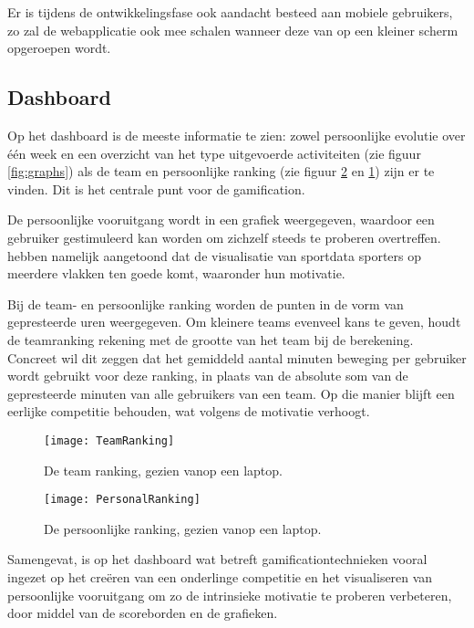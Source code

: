 Er is tijdens de ontwikkelingsfase ook aandacht besteed aan mobiele gebruikers, zo zal de webapplicatie ook mee schalen wanneer deze van op een kleiner scherm opgeroepen wordt.

\subsection{Dashboard}
Op het dashboard is de meeste informatie te zien: zowel persoonlijke evolutie over één week en een overzicht van het type uitgevoerde activiteiten (zie figuur \ref{fig:graphs}) als de team en persoonlijke ranking (zie figuur \ref{fig:personalRanking} en \ref{fig:teamRanking}) zijn er te vinden. Dit is het centrale punt voor de gamification.

De persoonlijke vooruitgang wordt in een grafiek weergegeven, waardoor een gebruiker gestimuleerd kan worden om zichzelf steeds te proberen overtreffen. \linebreak \textcite{Schiewe2020} hebben namelijk aangetoond dat de visualisatie van sportdata sporters op meerdere vlakken ten goede komt, waaronder hun motivatie.

Bij de team- en persoonlijke ranking worden de punten in de vorm van gepresteerde uren weergegeven. Om kleinere teams evenveel kans te geven, houdt de teamranking rekening met de grootte van het team bij de berekening. Concreet wil dit zeggen dat het gemiddeld aantal minuten beweging per gebruiker wordt gebruikt voor deze ranking, in plaats van de absolute som van de gepresteerde minuten van alle gebruikers van een team. Op die manier blijft een eerlijke competitie behouden, wat volgens \textcite{Ivanova2019} de motivatie verhoogt.

\begin{figure}[h]
    \caption[Team ranking]{De team ranking, gezien vanop een laptop.}
    \texttt{[image: TeamRanking]}
    \label{fig:teamRanking}
\end{figure}

\begin{figure}[h]
    \caption[Persoonlijke ranking]{De persoonlijke ranking, gezien vanop een laptop.}
    \texttt{[image: PersonalRanking]}
    \label{fig:personalRanking}
\end{figure}

Samengevat, is op het dashboard wat betreft gamificationtechnieken vooral ingezet op het creëren van een onderlinge competitie en het visualiseren van persoonlijke vooruitgang om zo de intrinsieke motivatie te proberen verbeteren, door middel van de scoreborden en de grafieken.

